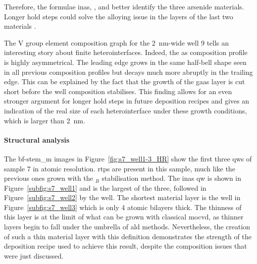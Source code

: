 Therefore, the formulae \acs{inas}, , and  better identify the three arsenide materials. Longer hold steps could solve the alloying issue in the layers of the last two materials \cite{Brugnolotto2023_2}.

The V group element composition graph for the \qty{2}{\nano\metre}-wide well 9 tells an interesting story about finite heterointerfaces. Indeed, the \acl{as} composition profile is highly asymmetrical. The leading edge grows in the same half-bell shape seen in all previous composition profiles but decays much more abruptly in the trailing edge. This can be explained by the fact that the growth of the \acs{gaas} layer is cut short before the well composition stabilises. This finding allows for an even stronger argument for longer hold steps in future deposition recipes and gives an indication of the real size of each heterointerface under these growth conditions, which is larger than \qty{2}{\nano\metre}.
\par

\paragraph{Structural analysis} The \acs{bf}-\acs{stem_m} images in Figure~\ref{fig:s7_well1-3_HR} show the first three \acl{qw}s of sample 7 in atomic resolution. \Acl{rtp}s are present in this sample, much like the previous ones grown with the \(_B\) stabilisation method. The \acs{inas} \acs{qw} is shown in Figure~\ref{subfig:s7_well1} and is the largest of the three, followed in Figure~\ref{subfig:s7_well2} by the  well. The shortest material layer is the  well in Figure~\ref{subfig:s7_well3} which is only \num{4} atomic bilayers thick. The thinness of this layer is at the limit of what can be grown with classical \acs{mocvd}, as thinner layers begin to fall under the umbrella of \acf{ald} methods. Nevertheless, the creation of such a thin material layer with this definition demonstrates the strength of the deposition recipe used to achieve this result, despite the composition issues that were just discussed.
\par

